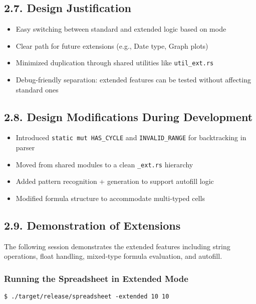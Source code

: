 \subsection*{2.7. Design Justification}
\begin{itemize}
    \item Easy switching between standard and extended logic based on mode
    \item Clear path for future extensions (e.g., Date type, Graph plots)
    \item Minimized duplication through shared utilities like \texttt{util\_ext.rs}
    \item Debug-friendly separation: extended features can be tested without affecting standard ones
\end{itemize}

\subsection*{2.8. Design Modifications During Development}
\begin{itemize}
    \item Introduced \texttt{static mut HAS\_CYCLE} and \texttt{INVALID\_RANGE} for backtracking in parser
    \item Moved from shared modules to a clean \texttt{\_ext.rs} hierarchy
    \item Added pattern recognition + generation to support autofill logic
    \item Modified formula structure to accommodate multi-typed cells
\end{itemize}



\subsection*{2.9. Demonstration of Extensions}

The following session demonstrates the extended features including string operations, float handling, mixed-type formula evaluation, and autofill.

\subsubsection*{Running the Spreadsheet in Extended Mode}

\begin{verbatim}
$ ./target/release/spreadsheet -extended 10 10
\end{verbatim}

